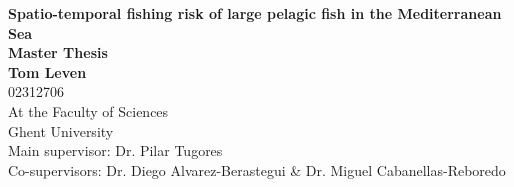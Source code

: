 \begin{titlepage}
\vspace{2cm} 
  
  \begin{center}
    {\LARGE \textbf{Spatio-temporal fishing risk of large pelagic fish in the Mediterranean Sea}}\\[1cm]
  
    \textbf{Master Thesis}\\
    \textbf{Tom Leven}\\[0.5cm]
    02312706\\[1.5cm]
  
    At the Faculty of Sciences\\
    Ghent University\\[1.5cm]
  
    Main supervisor: Dr. Pilar Tugores\\
    Co-supervisors: Dr. Diego Alvarez-Berastegui \& Dr. Miguel Cabanellas-Reboredo


    \end{center}

\end{titlepage}
\restoregeometry
